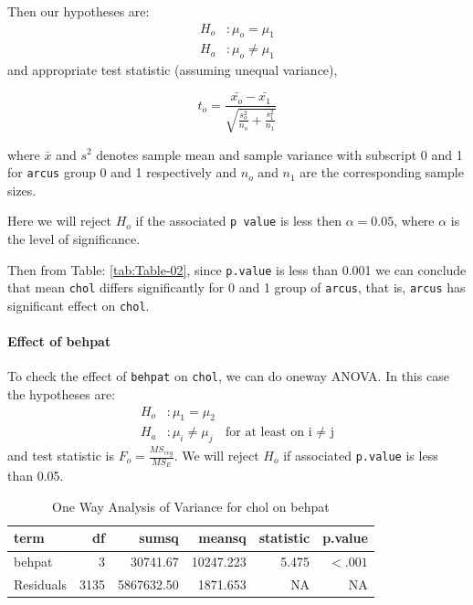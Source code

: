 \documentclass[
  12pt,
  oneside]{article}
\begin{document}
Then our hypotheses are:
\begin{align*}
H_o&: \mu_o = \mu_1 \\
H_a&: \mu_o \neq \mu_1
\end{align*}
and appropriate test statistic (assuming unequal variance),

\[
t_o = \frac{\bar{x_o} - \bar{x_1}}{\sqrt{\frac{s_o^2}{n_o} + \frac{s_1^2}{n_1}}}
\]

where \(\bar{x}\) and \(s^2\) denotes sample mean and sample variance with subscript
0 and 1 for \texttt{arcus} group 0 and 1 respectively and \(n_o\) and \(n_1\) are the corresponding sample sizes.

Here we will reject \(H_o\) if the associated \texttt{p\ value} is less then \(\alpha = 0.05\), where \(\alpha\) is the level of significance.

Then from Table: \ref{tab:Table-02}, since \texttt{p.value} is less than 0.001 we can conclude that mean \texttt{chol} differs significantly for 0 and 1 group of \texttt{arcus}, that is, \texttt{arcus} has significant effect on \texttt{chol}.

\hypertarget{effect-of-behpat}{%
\paragraph{Effect of behpat}\label{effect-of-behpat}}

To check the effect of \texttt{behpat} on \texttt{chol}, we can do oneway ANOVA. In this case the hypotheses are:
\begin{align*}
H_o&: \mu_1 = \mu_2 \\
H_a&: \mu_i \neq \mu_j \! &\text{for at least on i $\ne$ j}
\end{align*}
and test statistic is \(F_o = \frac{MS_{reg}}{MS_{E}}\). We will reject \(H_o\) if associated \texttt{p.value} is less than 0.05.

\begin{table}[H]

\caption{\label{tab:Table-03}One Way Analysis of Variance for chol on behpat}
\centering
\begin{tabular}[t]{lrrrrr}
\toprule
term & df & sumsq & meansq & statistic & p.value\\
\midrule
behpat & 3 & 30741.67 & 10247.223 & 5.475 & $<.001$\\
Residuals & 3135 & 5867632.50 & 1871.653 & NA & NA\\
\bottomrule
\end{tabular}
\end{table}
\end{document}
